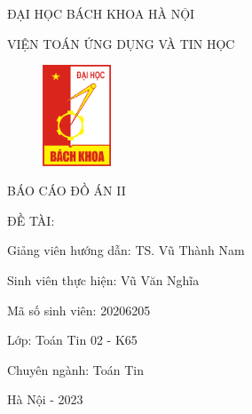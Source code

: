ĐẠI HỌC BÁCH KHOA HÀ NỘI

VIỆN TOÁN ỨNG DỤNG VÀ TIN HỌC

\begin{figure}[h]
\centering
\includegraphics[height = 3cm]{pictures/logoBK.png}
\end{figure}

BÁO CÁO ĐỒ ÁN II

ĐỀ TÀI:



Giảng viên hướng dẫn: TS. Vũ Thành Nam

Sinh viên thực hiện: Vũ Văn Nghĩa

Mã số sinh viên: 20206205

Lớp: Toán Tin 02 - K65

Chuyên ngành: Toán Tin

Hà Nội - 2023